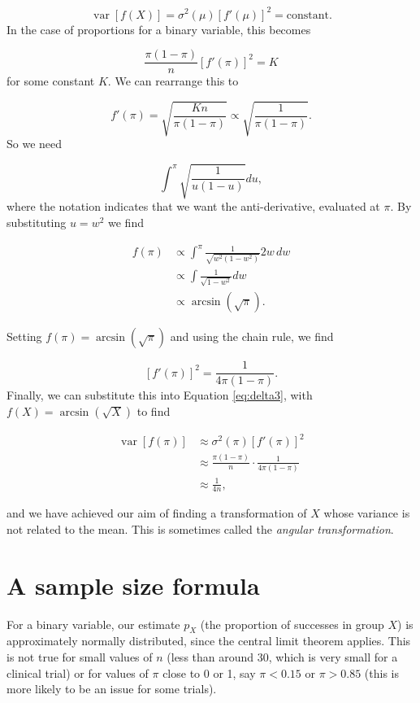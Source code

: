 \documentclass[
  openany]{book}
\theoremstyle{definition}
\theoremstyle{definition}
\theoremstyle{definition}
\theoremstyle{definition}
\theoremstyle{remark}
\begin{document}
\[ \operatorname{var}\left[f\left(X\right)\right] = \sigma^2\left(\mu\right) \left[f'\left(\mu\right)\right]^2 = \text{constant}. \]
In the case of proportions for a binary variable, this becomes

\[ \frac{\pi\left(1-\pi\right)}{n} \left[f'\left(\pi\right)\right]^2 = K\]
for some constant \(K\). We can rearrange this to

\[f'\left(\pi\right) = \sqrt{\frac{Kn}{\pi\left(1-\pi\right)} } \propto \sqrt{\frac{1}{\pi\left(1-\pi\right)}}.\]
So we need

\[\int^\pi \sqrt{\frac{1}{u\left(1-u\right)}}du, \]
where the notation indicates that we want the anti-derivative, evaluated at \(\pi\). By substituting \(u = w^2\) we find

\begin{align*}
f\left(\pi\right) & \propto \int^\pi{\frac{1}{\sqrt{w^2\left(1-w^2\right)}}2w\,dw}\\
&\propto \int{\frac{1}{\sqrt{1 - w^2}}}dw\\
& \propto \arcsin{\left(\sqrt{\pi}\right)}.
\end{align*}

Setting \(f\left(\pi\right) = \arcsin\left(\sqrt{\pi}\right)\) and using the chain rule, we find

\[\left[f'\left(\pi\right)\right]^2 = \frac{1}{4\pi\left(1-\pi\right)} .\]
Finally, we can substitute this into Equation \eqref{eq:delta3}, with \(f\left(X\right) = \arcsin\left(\sqrt{X}\right)\) to find

\begin{align*}
  \operatorname{var}\left[f\left(\pi\right)\right] & \approx \sigma^2\left(\pi\right)\left[f'\left(\pi\right)\right]^2  \\
& \approx{\frac{\pi\left(1-\pi\right)}{n}\cdot\frac{1}{4\pi\left(1-\pi\right)}}\\
& \approx{\frac{1}{4n}},
\end{align*}

and we have achieved our aim of finding a transformation of \(X\) whose variance is not related to the mean. This is sometimes called the \emph{angular transformation}.

\section{A sample size formula}\label{a-sample-size-formula}

For a binary variable, our estimate \(p_X\) (the proportion of successes in group \(X\)) is approximately normally distributed, since the central limit theorem applies. This is not true for small values of \(n\) (less than around 30, which is very small for a clinical trial) or for values of \(\pi\) close to 0 or 1, say \(\pi<0.15\) or \(\pi>0.85\) (this is more likely to be an issue for some trials).
\end{document}
